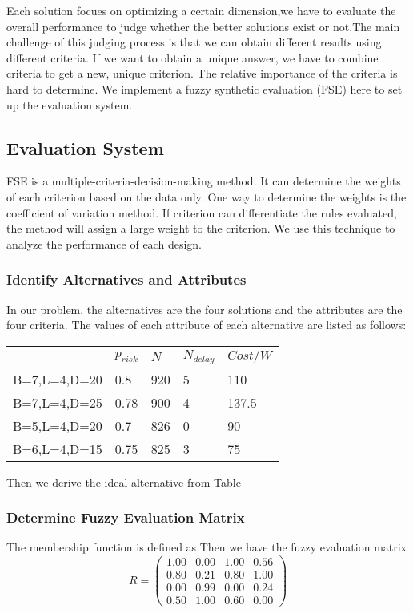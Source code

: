 Each solution focues on optimizing a certain dimension,we have to evaluate the overall performance to judge whether the better solutions exist or not.The main challenge of this judging process is that we can obtain different results using different criteria. If we want to obtain a unique answer, we have to combine criteria to get a new, unique criterion. The relative importance of the criteria is hard to determine. We implement a fuzzy synthetic evaluation (FSE) here to set up the evaluation system.
\subsection{Evaluation System}
FSE is a multiple-criteria-decision-making method. It can determine the weights of each criterion based on the data only. One way to determine the weights is the coefficient of variation method. If criterion can differentiate the rules evaluated, the method will assign a large weight to the criterion. We use this technique to analyze the performance of each design.
\subsubsection{Identify Alternatives and Attributes}
In our problem, the alternatives are the four solutions and the attributes are the four criteria. The values of each attribute of each alternative are listed as follows:

\begin{table}
\centering
\begin{tabular}{|l|l|l|l|l|}
\hline

 &$p_{risk}$ & $N$ & $N_{delay}$ & $Cost/W$\\
\hline
B=7,L=4,D=20 & 0.8 & 920 & 5 & 110\\
\hline
B=7,L=4,D=25&0.78&900&4&137.5\\
\hline
B=5,L=4,D=20&0.7&826&0&90\\
\hline
B=6,L=4,D=15&0.75&825&3&75\\
\hline
\end{tabular}
\end{table}

Then we derive the ideal alternative from Table
\subsubsection{Determine Fuzzy Evaluation Matrix}
The membership function is defined as
Then we have the fuzzy evaluation matrix
\begin{equation*}
R = 
\begin{pmatrix}
1.00 & 0.00 & 1.00 & 0.56\\
0.80 & 0.21 & 0.80 & 1.00\\
0.00 & 0.99 & 0.00 & 0.24 \\
0.50 & 1.00 & 0.60 & 0.00
\end{pmatrix}
\end{equation*}

